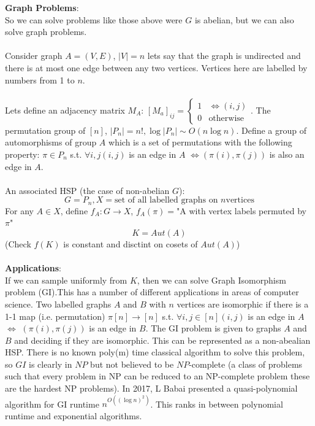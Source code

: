\documentclass{article}
\begin{document}
\textbf{Graph Problems}:\\
So we can solve problems like those above were $G$ is abelian, but we can also solve graph problems.\\\\
Consider graph $A = (V,E)$, $|V| = n$ lets say that the graph is undirected and there is at most one edge between any two vertices. Vertices here are labelled by numbers from 1 to $n$.\\\\
Lets define an adjacency matrix $M_A$: $[M_a]_{ij} = \begin{cases} 1 & \iff (i,j)\\ 0 & \text{otherwise} \end{cases}$. The permutation group of $[n]$, $|P_n| = n!, \log |P_n| \sim O(n \log n)$. Define a group of automorphisms of group $A$ which is a set of permutations with the following property: $\pi \in P_n$ s.t. $\forall i,j (i,j)$ is an edge in $A$ $\iff (\pi(i), \pi(j))$ is also an edge in $A$.\\\\
An associated HSP (the case of non-abelian $G$):
$$
G = P_n, X = \text{set of all labelled graphs on }n\text{vertices}
$$
For any $A \in X$, define $f_A: G \rightarrow X$, $f_A(\pi) = $"A with vertex labels permuted by $\pi$"
$$
K = Aut(A)
$$
(Check $f(K)$ is constant and disctint on cosets of $Aut(A)$)\\\\
\textbf{Applications}:\\
If we can sample uniformly from $K$, then we can solve Graph Isomorphism problem (GI).This has a number of different applications in areas of computer science. Two labelled graphs $A$ and $B$ with $n$ vertices are isomorphic if there is a 1-1 map (i.e. permutation) $\pi[n] \rightarrow [n]$ s.t. $\forall i,j \in [n] (i,j)$ is an edge in $A$ $\iff$ $(\pi(i), \pi(j))$ is an edge in $B$. The GI problem is given to graphs $A$ and $B$ and deciding if they are isomorphic. This can be represented as a non-abealian HSP. There is no known poly(m) time classical algorithm to solve this problem, so $GI$ is clearly in $NP$ but not believed to be $NP$-complete (a class of problems such that every problem in NP can be reduced to an NP-complete problem these are the hardest NP problems).
In 2017, L Babai presented a quasi-polynomial algorithm for GI runtime $n^{O((\log n)^2)}$. This ranks in between polynomial runtime and exponential algorithms.
\end{document}
